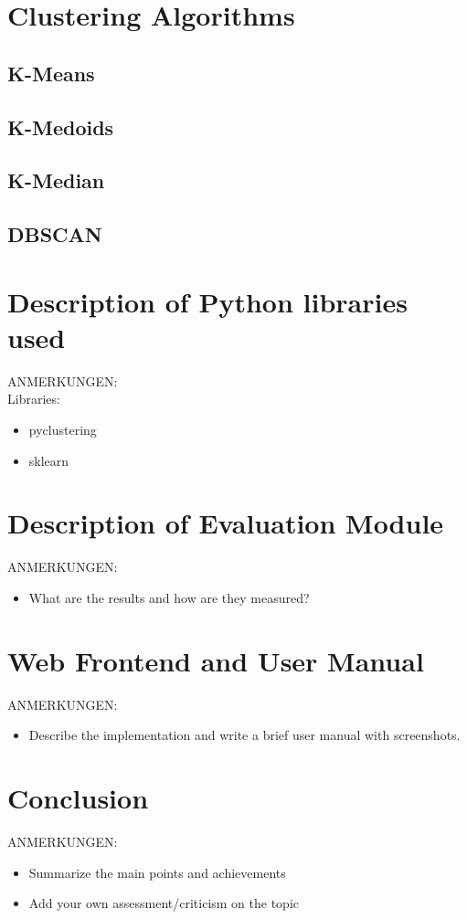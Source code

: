\documentclass[12pt]%
{article}
\begin{document}
\section{Clustering Algorithms}
\subsection{K-Means}
\subsection{K-Medoids}
\subsection{K-Median}
\subsection{DBSCAN}



\section{Description of Python libraries used}
ANMERKUNGEN:\\
Libraries:
\begin{itemize}
\item pyclustering
\item sklearn
%
\end{itemize}

\section{Description of Evaluation Module}
ANMERKUNGEN:
\begin{itemize}
\item What are the results and how are they measured?
\end{itemize}

\section{Web Frontend and User Manual}
ANMERKUNGEN:
\begin{itemize}
\item Describe the implementation and write a brief user manual with screenshots.
\end{itemize}

\section{Conclusion}
ANMERKUNGEN:
\begin{itemize}
\item Summarize the main points and achievements
\item Add your own assessment/criticism on the topic
\end{itemize}

\newpage

\printglossary[style=altlist,title=Glossary]
 
\printglossary[type=\acronymtype,style=long]
 
\printglossary[type=symbolslist,style=long]

\newpage




\nocite{*}
\end{document}
